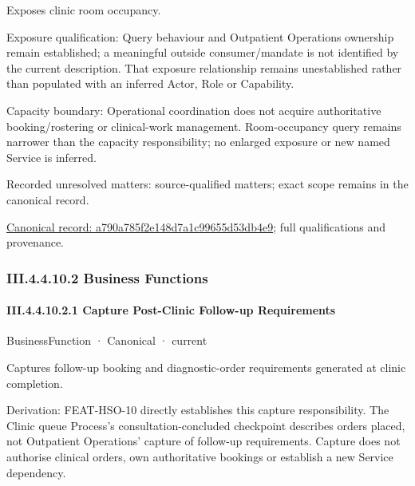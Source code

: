 Exposes clinic room occupancy.



Exposure qualification: Query behaviour and Outpatient Operations ownership remain established; a meaningful outside consumer/mandate is not identified by the current description. That exposure relationship remains unestablished rather than populated with an inferred Actor, Role or Capability.



Capacity boundary: Operational coordination does not acquire authoritative booking/rostering or clinical-work management. Room-occupancy query remains narrower than the capacity responsibility; no enlarged exposure or new named Service is inferred.


{\small Recorded unresolved matters: source-qualified matters; exact scope remains in the canonical record.}\par
{\footnotesize \href{../../../../continuum/business/business-service/a790a785f2e148d7a1c99655d53db4e9.md}{Canonical record: a790a785f2e148d7a1c99655d53db4e9}; full qualifications and provenance.}\par
\subsubsection*{III.4.4.10.2 Business Functions}
\label{navigation:III.4.4.10.2}

\paragraph*{III.4.4.10.2.1 Capture Post-Clinic Follow-up Requirements}
\label{navigation:III.4.4.10.2.1}

\label{element:9136f75069bf4770bcc8dc395204d475}
{\small BusinessFunction · Canonical · current}\par

Captures follow-up booking and diagnostic-order requirements generated at clinic completion.



Derivation: FEAT-HSO-10 directly establishes this capture responsibility. The Clinic queue Process's consultation-concluded checkpoint describes orders placed, not Outpatient Operations' capture of follow-up requirements. Capture does not authorise clinical orders, own authoritative bookings or establish a new Service dependency.


